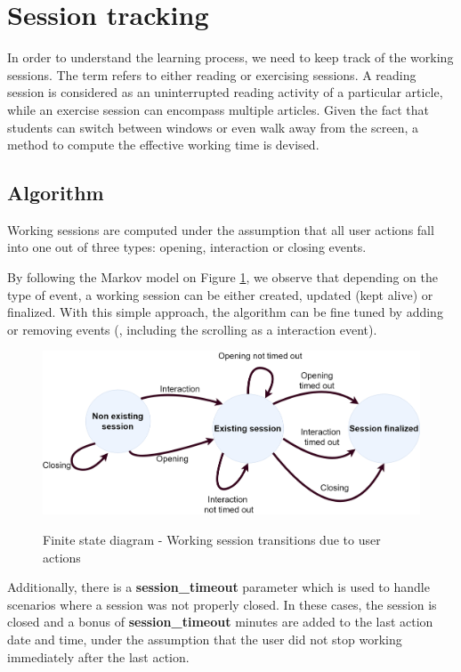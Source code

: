 \section{Session tracking}\label{p02:session_tracking}

In order to understand the learning process, we need to keep track of the working sessions. The term refers to either reading or exercising sessions. A reading session is considered as an uninterrupted reading activity of a particular article, while an exercise session can encompass multiple articles. Given the fact that students can switch between windows or even walk away from the screen, a method to compute the effective working time is devised. 

\subsection{Algorithm}
Working sessions are computed under the assumption that all user actions fall into one out of three types: opening, interaction or closing events.

By following the Markov model on Figure \ref{fig:markov_diagram}, we observe that depending on the type of event, a working session can be either created, updated (kept alive) or finalized. With this simple approach, the algorithm can be fine tuned by adding or removing events (\eg, including the scrolling as a interaction event).

\begin{figure}[bth]
	{\includegraphics[width=1\linewidth]{gfx/Finite_state_machine_diagramv2}} \quad
	\caption[Finite state diagram - Working session transitions due to user actions]{Finite state diagram - Working session transitions due to user actions}\label{fig:markov_diagram}
\end{figure}

Additionally, there is a \textbf{session\_timeout} parameter which is used to handle scenarios where a session was not properly closed. In these cases, the session is closed and a bonus of \textbf{session\_timeout} minutes are added to the last action date and time, under the assumption that the user did not stop working immediately after the last action.


